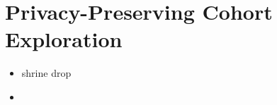 \chapter{Privacy-Preserving Cohort Exploration}

\begin{itemize}
    \item shrine drop
    \item 
\end{itemize}